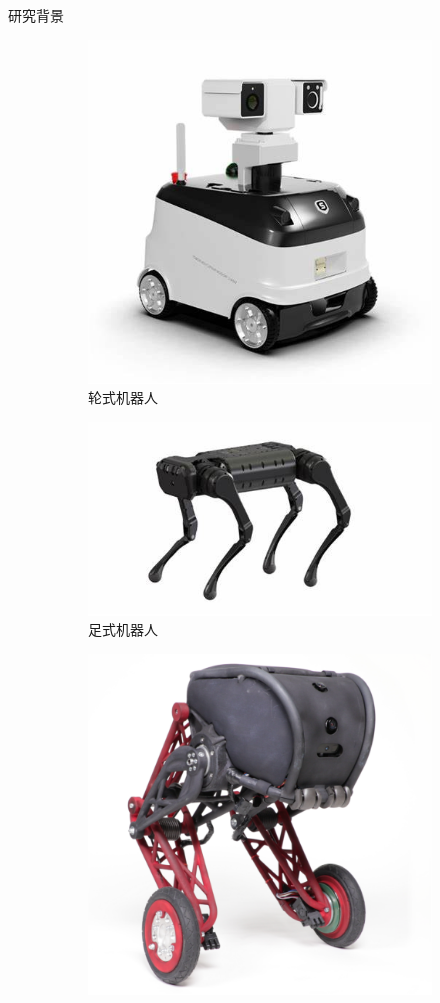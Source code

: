 \documentclass{beamer}
\begin{document}
	\begin{frame}{研究背景}
		\begin{figure}[t]
			\centering
			\begin{subfigure}{0.3\textwidth}
				\centering
				\includegraphics[width=0.7\linewidth]{img/chapter1/3}
				\caption{轮式机器人}
			\end{subfigure}
			\hfill
			\begin{subfigure}{0.3\textwidth}
				\centering
				\includegraphics[width=1.2\linewidth]{img/chapter1/4}
				\caption{足式机器人}
			\end{subfigure}
			\hfill
			\begin{subfigure}{0.3\textwidth}
				\centering
				\includegraphics[width=0.7\linewidth]{img/chapter1/1}

\end{subfigure}
\end{figure}
\end{frame}
\end{document}
